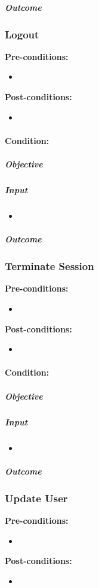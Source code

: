 \documentclass{article}
\begin{document}
		\subparagraph{Outcome}
		
		\subsubsection{Logout}
		\textbf{Pre-conditions:}
		\begin{itemize}
			\item 
		\end{itemize}
		\textbf{Post-conditions:}
		\begin{itemize}
			\item 
		\end{itemize}
		
		\paragraph{Condition: }
		\subparagraph{Objective}
		
		\subparagraph{Input}
		\begin{itemize}
			\item 
		\end{itemize}
		
		\subparagraph{Outcome}
		
		\subsubsection{Terminate Session}
		\textbf{Pre-conditions:}
		\begin{itemize}
			\item 
		\end{itemize}
		\textbf{Post-conditions:}
		\begin{itemize}
			\item 
		\end{itemize}
		
		\paragraph{Condition: }
		\subparagraph{Objective}
		
		\subparagraph{Input}
		\begin{itemize}
			\item 
		\end{itemize}
		
		\subparagraph{Outcome}
		
		\subsubsection{Update User}
		\textbf{Pre-conditions:}
		\begin{itemize}
			\item 
		\end{itemize}
		\textbf{Post-conditions:}
		\begin{itemize}
			\item 
		\end{itemize}
		
\end{document}
